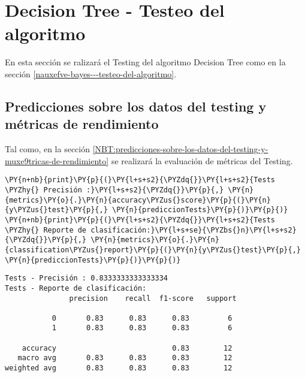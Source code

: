     \hypertarget{decision-tree---testeo-del-algoritmo}{%
\section{Decision Tree - Testeo del algoritmo}\label{decision-tree---testeo-del-algoritmo}}

	En esta sección se ralizará el Testing del algoritmo Decision Tree como en la sección \ref{nauxefve-bayes---testeo-del-algoritmo}.

    \hypertarget{predicciones-sobre-los-datos-del-testing-y-muxe9tricas-de-rendimiento}{%
\subsection{Predicciones sobre los datos del testing y métricas de rendimiento}\label{predicciones-sobre-los-datos-del-testing-y-muxe9tricas-de-rendimiento}}

	Tal como, en la sección \ref{NBT:predicciones-sobre-los-datos-del-testing-y-muxe9tricas-de-rendimiento} se realizará la evaluación de métricas del Testing.

    \begin{tcolorbox}[breakable, size=fbox, boxrule=1pt, pad at break*=1mm,colback=cellbackground, colframe=cellborder]
\begin{Verbatim}[commandchars=\\\{\}]
\PY{n+nb}{print}\PY{p}{(}\PY{l+s+s2}{\PYZdq{}}\PY{l+s+s2}{Tests \PYZhy{} Precisión :}\PY{l+s+s2}{\PYZdq{}}\PY{p}{,} \PY{n}{metrics}\PY{o}{.}\PY{n}{accuracy\PYZus{}score}\PY{p}{(}\PY{n}{y\PYZus{}test}\PY{p}{,} \PY{n}{prediccionTests}\PY{p}{)}\PY{p}{)}
\PY{n+nb}{print}\PY{p}{(}\PY{l+s+s2}{\PYZdq{}}\PY{l+s+s2}{Tests \PYZhy{} Reporte de clasificación:}\PY{l+s+se}{\PYZbs{}n}\PY{l+s+s2}{\PYZdq{}}\PY{p}{,} \PY{n}{metrics}\PY{o}{.}\PY{n}{classification\PYZus{}report}\PY{p}{(}\PY{n}{y\PYZus{}test}\PY{p}{,} \PY{n}{prediccionTests}\PY{p}{)}\PY{p}{)}
\end{Verbatim}
\end{tcolorbox}

    \begin{Verbatim}[commandchars=\\\{\}]
Tests - Precisión : 0.8333333333333334
Tests - Reporte de clasificación:
               precision    recall  f1-score   support

           0       0.83      0.83      0.83         6
           1       0.83      0.83      0.83         6

    accuracy                           0.83        12
   macro avg       0.83      0.83      0.83        12
weighted avg       0.83      0.83      0.83        12

    \end{Verbatim}

